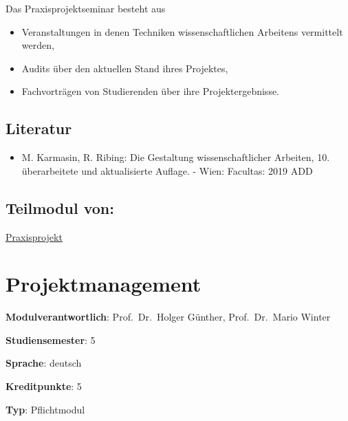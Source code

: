 Das Praxisprojektseminar besteht aus

\begin{itemize}
\tightlist
\item
  Veranstaltungen in denen Techniken wissenschaftlichen Arbeitens
  vermittelt werden,
\item
  Audits über den aktuellen Stand ihres Projektes,
\item
  Fachvorträgen von Studierenden über ihre Projektergebnisse.
\end{itemize}

\hypertarget{literaturpathlabelmi-2017modulbeschreibungen-bachelorba_praxisprojektseminar}{%
\section*{Literatur\label{/mi-2017/modulbeschreibungen-bachelor/BA_Praxisprojektseminar}}\label{literaturpathlabelmi-2017modulbeschreibungen-bachelorba_praxisprojektseminar}}

\begin{itemize}
\tightlist
\item
  M. Karmasin, R. Ribing: Die Gestaltung wissenschaftlicher Arbeiten,
  10. überarbeitete und aktualisierte Auflage. - Wien: Facultas: 2019
  ADD
\end{itemize}

\hypertarget{teilmodul-vonpathlabelmi-2017modulbeschreibungen-bachelorba_praxisprojektseminar}{%
\section*{Teilmodul
von:\label{/mi-2017/modulbeschreibungen-bachelor/BA_Praxisprojektseminar}}\label{teilmodul-vonpathlabelmi-2017modulbeschreibungen-bachelorba_praxisprojektseminar}}

\hyperref[/mi-2017/modulbeschreibungen-bachelor/BA_Praxisprojekt]{Praxisprojekt}

\hypertarget{projektmanagementpathlabelmi-2017modulbeschreibungen-bachelorba_projektmanagement}{%
\chapter{Projektmanagement\label{/mi-2017/modulbeschreibungen-bachelor/BA_Projektmanagement}}\label{projektmanagementpathlabelmi-2017modulbeschreibungen-bachelorba_projektmanagement}}

\begin{modulHead}
\textbf{Modulverantwortlich}: Prof.~Dr.~Holger
Günther, Prof.~Dr.~Mario
Winter
\end{modulHead}
\begin{modulHead}
\textbf{Studiensemester}:
5
\end{modulHead}
\begin{modulHead}
\textbf{Sprache}:
deutsch
\end{modulHead}
\begin{modulHead}
\textbf{Kreditpunkte}:
5
\end{modulHead}
\begin{modulHead}
\textbf{Typ}:
Pflichtmodul
\end{modulHead}


